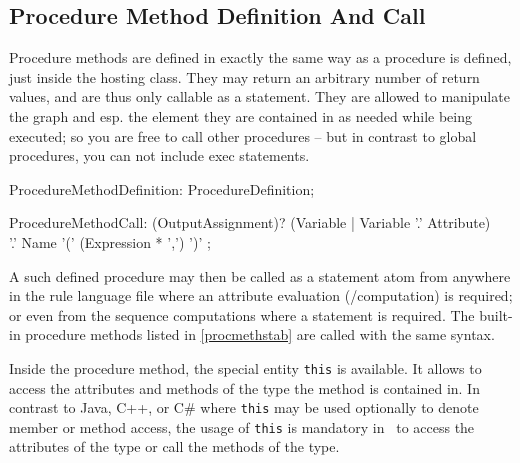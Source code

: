 \subsection{Procedure Method Definition And Call}\label{sub:proceduremethods}\label{sec:procmethcall} 

Procedure methods are defined in exactly the same way as a procedure is defined, just inside the hosting class.
They may return an arbitrary number of return values, and are thus only callable as a statement.
They are allowed to manipulate the graph and esp. the element they are contained in as needed while being executed;
so you are free to call other procedures -- but in contrast to global procedures, you can not include exec statements.

\begin{rail} 
  ProcedureMethodDefinition: ProcedureDefinition;
\end{rail}

\begin{rail}
  ProcedureMethodCall: (OutputAssignment)? (Variable | Variable '.' Attribute) \\
		'.' Name '(' (Expression * ',') ')' ;
\end{rail}

A such defined procedure may then be called as a statement atom from anywhere in the rule language file where an attribute evaluation (/computation) is required; or even from the sequence computations where a statement is required.
The built-in procedure methods listed in \ref{procmethstab} are called with the same syntax.

Inside the procedure method, the special entity \texttt{this} is available.
It allows to access the attributes and methods of the type the method is contained in.
In contrast to Java, C++, or C\# where \texttt{this} may be used optionally to denote member or method access,
the usage of \texttt{this} is mandatory in \GrG~to access the attributes of the type or call the methods of the type.


